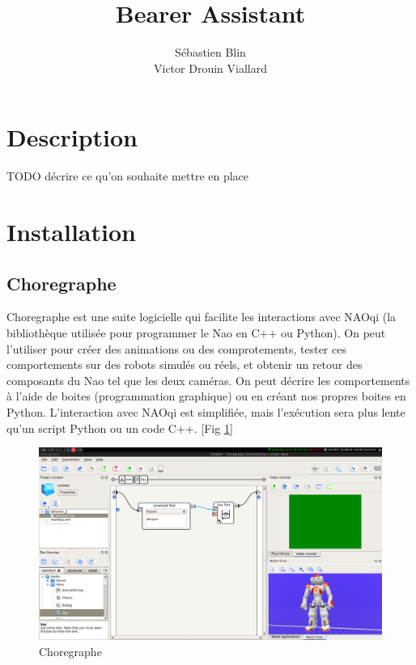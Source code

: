 \documentclass{article}
\title{Bearer Assistant}
\author{Sébastien Blin\\Victor Drouin Viallard}
\begin{document}
\maketitle

\section{Description}
TODO décrire ce qu'on souhaite mettre en place


\section{Installation}
\subsection{Choregraphe}

Choregraphe est une suite logicielle qui facilite les interactions avec NAOqi (la bibliothèque utilisée pour programmer le Nao en C++ ou Python). On peut l'utiliser pour créer des animations ou des comprotements, tester ces comportements sur des robots simulés ou réels, et obtenir un retour des composants du Nao tel que les deux caméras. On peut décrire les comportements à l'aide de boites (programmation graphique) ou en créant nos propres boites en Python. L'interaction avec NAOqi est simplifiée, mais l'exécution sera plus lente qu'un script Python ou un code C++. [Fig \ref{fig:choregraphe}]

\begin{figure}[h]
	\begin{center}
			\includegraphics[scale=0.2]{img/choregraphe}
		\caption{Choregraphe}
		\label{fig:choregraphe}
	\end{center}
\end{figure}
\end{document}

